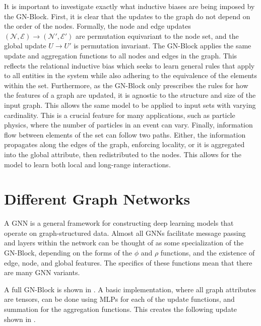 It is important to investigate exactly what inductive biases are being imposed by the GN-Block.
First, it is clear that the updates to the graph do not depend on the order of the nodes.
Formally, the node and edge updates $(\mathcal{N}, \mathcal{E}) \rightarrow (\mathcal{N}', \mathcal{E}')$ are permutation equivariant to the node set, and the global update $U \rightarrow U'$ is permutation invariant.
The GN-Block applies the same update and aggregation functions to all nodes and edges in the graph.
This reflects the relational inductive bias which seeks to learn general rules that apply to all entities in the system while also adhering to the equivalence of the elements within the set.
Furthermore, as the GN-Block only prescribes the rules for how the features of a graph are updated, it is agnostic to the structure and size of the input graph.
This allows the same model to be applied to input sets with varying cardinality.
This is a crucial feature for many applications, such as particle physics, where the number of particles in an event can vary.
Finally, information flow between elements of the set can follow two paths.
Either, the information propagates along the edges of the graph, enforcing locality, or it is aggregated into the global attribute, then redistributed to the nodes.
This allows for the model to learn both local and long-range interactions.

\section{Different Graph Networks}

A GNN is a general framework for constructing deep learning models that operate on graph-structured data.
Almost all GNNs facilitate message passing and layers within the network can be thought of as some specialization of the GN-Block, depending on the forms of the $\phi$ and $\rho$ functions, and the existence of edge, node, and global features.
The specifics of these functions mean that there are many GNN variants.

A full GN-Block is shown in .
A basic implementation, where all graph attributes are tensors, can be done using MLPs for each of the update functions, and summation for the aggregation functions.
This creates the following update shown in .

